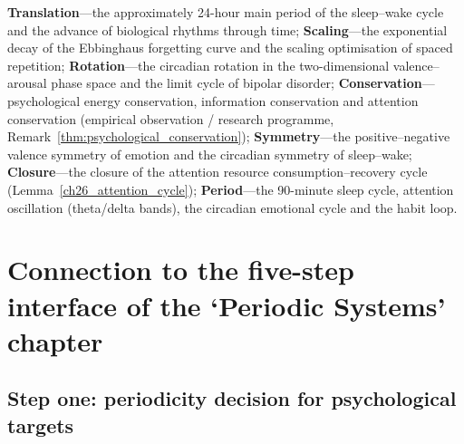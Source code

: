 \begin{remark}\label{rem:psych_seven_themes}
\textbf{Translation}---the approximately 24-hour main period of the sleep--wake cycle and the advance of biological rhythms through time; \textbf{Scaling}---the exponential decay of the Ebbinghaus forgetting curve and the scaling optimisation of spaced repetition; \textbf{Rotation}---the circadian rotation in the two-dimensional valence--arousal phase space and the limit cycle of bipolar disorder; \textbf{Conservation}---psychological energy conservation, information conservation and attention conservation (empirical observation / research programme, Remark~\ref{thm:psychological_conservation}); \textbf{Symmetry}---the positive--negative valence symmetry of emotion and the circadian symmetry of sleep--wake; \textbf{Closure}---the closure of the attention resource consumption--recovery cycle (Lemma~\ref{ch26_attention_cycle}); \textbf{Period}---the 90-minute sleep cycle, attention oscillation (theta/delta bands), the circadian emotional cycle and the habit loop.
\end{remark}

\section{Connection to the five-step interface of the `Periodic Systems' chapter}
\label{sec:psych_five_steps}

\subsection{Step one: periodicity decision for psychological targets}

